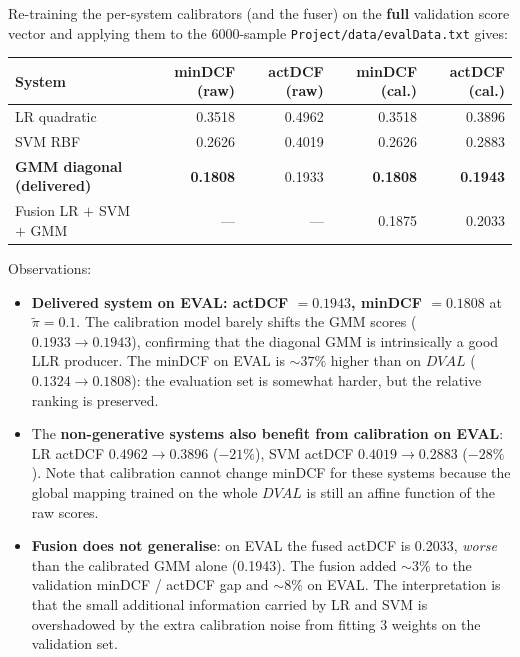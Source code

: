 \documentclass[11pt,a4paper]{article}
\begin{document}
Re-training the per-system calibrators (and the fuser) on the
\textbf{full} validation score vector and applying them to the
6000-sample \texttt{Project/data/evalData.txt} gives:

\begin{table}[H]
\centering
\small
\begin{tabular}{lrrrr}
\toprule
System & minDCF (raw) & actDCF (raw) & minDCF (cal.) & actDCF (cal.) \\
\midrule
LR quadratic                      & 0.3518 & 0.4962 & 0.3518 & 0.3896 \\
SVM RBF                           & 0.2626 & 0.4019 & 0.2626 & 0.2883 \\
\textbf{GMM diagonal (delivered)} & \textbf{0.1808} & 0.1933 & \textbf{0.1808} & \textbf{0.1943} \\
Fusion LR $+$ SVM $+$ GMM         & --- & --- & 0.1875 & 0.2033 \\
\bottomrule
\end{tabular}
\end{table}

Observations:
\begin{itemize}
\item \textbf{Delivered system on EVAL: actDCF $=0.1943$,
      minDCF $=0.1808$} at $\tilde{\pi}=0.1$. The calibration model
      barely shifts the GMM scores ($0.1933 \to 0.1943$), confirming
      that the diagonal GMM is intrinsically a good LLR producer.
      The minDCF on EVAL is $\sim 37\%$ higher than on $\mathit{DVAL}$
      ($0.1324 \to 0.1808$): the evaluation set is somewhat harder,
      but the relative ranking is preserved.
\item The \textbf{non-generative systems also benefit from calibration
      on EVAL}: LR actDCF $0.4962 \to 0.3896$ ($-21\%$), SVM actDCF
      $0.4019 \to 0.2883$ ($-28\%$). Note that calibration cannot
      change minDCF for these systems because the global mapping
      trained on the whole $\mathit{DVAL}$ is still an affine
      function of the raw scores.
\item \textbf{Fusion does not generalise}: on EVAL the fused actDCF
      is 0.2033, \emph{worse} than the calibrated GMM alone (0.1943).
      The fusion added $\sim 3\%$ to the validation minDCF / actDCF
      gap and $\sim 8\%$ on EVAL. The interpretation is that the
      small additional information carried by LR and SVM is
      overshadowed by the extra calibration noise from fitting 3
      weights on the validation set.
\end{itemize}
\end{document}
